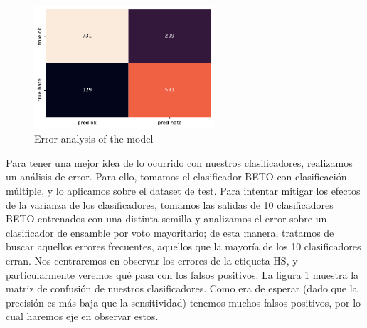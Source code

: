 
\begin{figure}[t]
    \centering
    \includegraphics[width=0.6\textwidth]{img/hateval_confusion_matrix.pdf}
    \caption{Error analysis of the model}
    \label{fig:hateval_error_analysis}
\end{figure}


Para tener una mejor idea de lo ocurrido con nuestros clasificadores, realizamos un análisis de error. Para ello, tomamos el clasificador BETO con clasificación múltiple, y lo aplicamos sobre el dataset de test. Para intentar mitigar los efectos de la varianza de los clasificadores, tomamos las salidas de 10 clasificadores BETO entrenados con una distinta semilla y analizamos el error sobre un clasificador de ensamble por voto mayoritario; de esta manera, tratamos de buscar aquellos errores frecuentes, aquellos que la mayoría de los 10 clasificadores erran. Nos centraremos en observar los errores de la etiqueta HS, y particularmente veremos qué pasa con los falsos positivos. La figura \ref{fig:hateval_error_analysis} muestra la matriz de confusión de nuestros clasificadores. Como era de esperar (dado que la precisión es más baja que la sensitividad) tenemos muchos falsos positivos, por lo cual haremos eje en observar estos.



